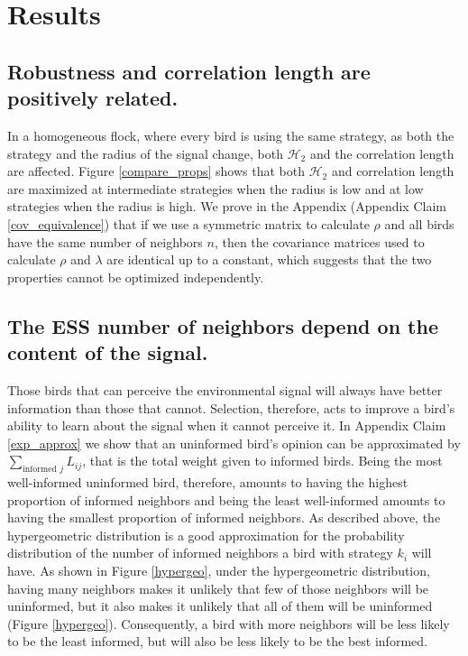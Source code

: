 \documentclass{article}
\begin{document}
\section{Results }

\subsection{Robustness and correlation length are positively related. }
In a homogeneous flock, where every bird is using the same strategy, as both the strategy and the radius of the signal change, both $\mathscr{H}_2$ and the correlation length are affected.  Figure \ref{compare_props} shows that both $\mathscr{H}_2$ and correlation length are maximized at intermediate strategies when the radius is low and at low strategies when the radius is high. We prove in the Appendix (Appendix Claim \ref{cov_equivalence}) that if we use a symmetric matrix to calculate $\rho$ and all birds have the same number of neighbors $n$, then the covariance matrices used to calculate $\rho$ and $\lambda$ are identical up to a constant, which suggests that the two properties cannot be optimized independently.

\subsection{The ESS number of neighbors depend on the content of the signal. }

Those birds that can perceive the environmental signal will always have better information than those that cannot. Selection, therefore, acts to improve a bird's ability to learn about the signal when it cannot perceive it.  In Appendix Claim \ref{exp_approx} we show that an uninformed bird's opinion can be approximated by $\sum_{\text{informed }j}L_{ij}$, that is the total weight given to informed birds.  Being the most well-informed uninformed bird, therefore, amounts to having the highest proportion of informed neighbors and being the least well-informed amounts to having the smallest proportion of informed neighbors. As described above, the hypergeometric distribution is a good approximation for the probability distribution of the number of informed neighbors a bird with strategy $k_i$ will have. As shown in Figure \ref{hypergeo}, under the hypergeometric distribution, having many neighbors makes it unlikely that few of those neighbors will be uninformed, but it also makes it unlikely that all of them will be uninformed (Figure \ref{hypergeo}).  Consequently, a bird with more neighbors will be less likely to be the least informed, but will also be less likely to be the best informed.
\end{document}
